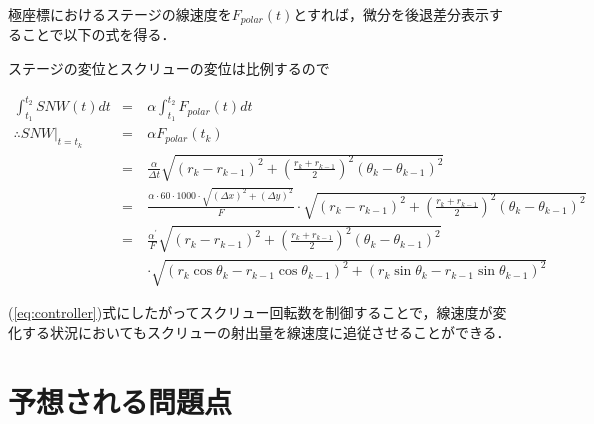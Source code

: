 \documentclass[twocolumn,oneside,a4paper]{article}
\begin{document}
極座標におけるステージの線速度を$F_{polar}(t)$とすれば，微分を後退差分表示することで以下の式を得る．


ステージの変位とスクリューの変位は比例するので
\begin{strip}
\begin{eqnarray}\label{eq:controller}
\int_{t_1}^{t_2} SNW(t)dt &=& \alpha \int_{t_1}^{t_2} F_{polar}(t) dt \nonumber \\
\therefore SNW\big|_{t=t_k} &=& \alpha F_{polar}(t_k)  \nonumber \\
&=& \frac{\alpha}{\Delta t} \sqrt{\left( r_k - r_{k-1} \right)^2 + \left(\frac{r_k+r_{k-1}}{2} \right)^2 \left( \theta_k - \theta_{k-1} \right)^2} \nonumber \\
&=& \frac{\alpha \cdot 60\cdot1000 \cdot \sqrt{(\Delta x)^2+(\Delta y)^2}}{F} \cdot \sqrt{\left( r_k - r_{k-1} \right)^2 + \left(\frac{r_k+r_{k-1}}{2} \right)^2  \left( \theta_k - \theta_{k-1} \right)^2} \nonumber \\
&=& \frac{\alpha^\prime}{F} \sqrt{\left( r_k - r_{k-1} \right)^2 + \left(\frac{r_k+r_{k-1}}{2} \right)^2  \left( \theta_k - \theta_{k-1} \right)^2 }  \nonumber \\
&\quad& \cdot \sqrt{ (r_k \cos\theta_k - r_{k-1} \cos\theta_{k-1})^2+(r_k \sin\theta_k - r_{k-1} \sin\theta_{k-1})^2 }
\end{eqnarray}
\end{strip}


(\ref{eq:controller})式にしたがってスクリュー回転数を制御することで，線速度が変化する状況においてもスクリューの射出量を線速度に追従させることができる．

\section{予想される問題点}
\end{document}
